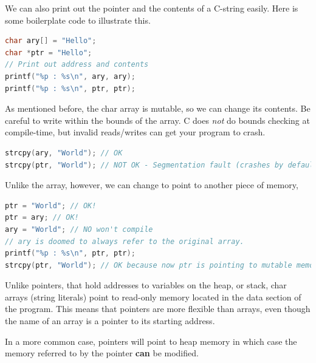 We can also print out the pointer and the contents of a C-string easily. Here is some boilerplate code to illustrate this.

\begin{lstlisting}[language=C]
char ary[] = "Hello";
char *ptr = "Hello";
// Print out address and contents
printf("%p : %s\n", ary, ary);
printf("%p : %s\n", ptr, ptr);
\end{lstlisting}

As mentioned before, the char array is mutable, so we can change its contents.
Be careful to write within the bounds of the array.
C does \emph{not} do bounds checking at compile-time, but invalid reads/writes can get your program to crash.

\begin{lstlisting}[language=C]
strcpy(ary, "World"); // OK
strcpy(ptr, "World"); // NOT OK - Segmentation fault (crashes by default; unless SIGSEGV is blocked)
\end{lstlisting}

Unlike the array, however, we can change  to point to another piece of memory,

\begin{lstlisting}[language=C]
ptr = "World"; // OK!
ptr = ary; // OK!
ary = "World"; // NO won't compile
// ary is doomed to always refer to the original array.
printf("%p : %s\n", ptr, ptr);
strcpy(ptr, "World"); // OK because now ptr is pointing to mutable memory (the array)
\end{lstlisting}

Unlike pointers, that hold addresses to variables on the heap, or stack, char arrays (string literals) point to read-only memory located in the data section of the program. This means that pointers are more flexible than arrays, even though the name of an array is a pointer to its starting address.

In a more common case, pointers will point to heap memory in which case the memory referred to by the pointer \textbf{can} be modified.


